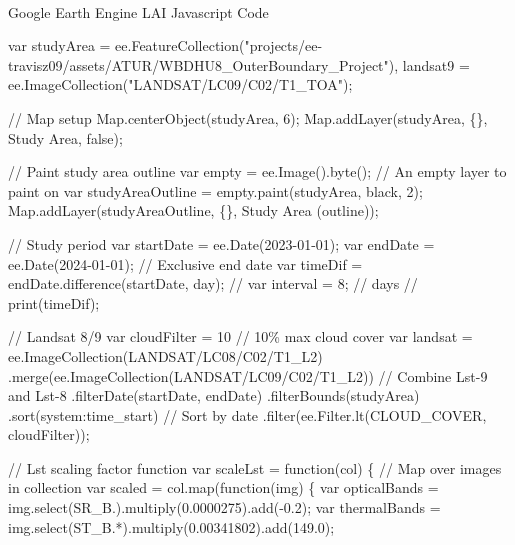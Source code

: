 \documentclass[
]{agujournal2019}
\makeatletter
\let\oldparagraph\paragraph
\renewcommand{\paragraph}{
    \@ifstar
      \xxxParagraphStar
      \xxxParagraphNoStar
  }
\newcommand{\xxxParagraphStar}[1]{\oldparagraph*{#1}\mbox{}}
\newcommand{\xxxParagraphNoStar}[1]{\oldparagraph{#1}\mbox{}}
\newenvironment{Shaded}{\begin{snugshade}}{\end{snugshade}}
\newcommand{\NormalTok}[1]{\textcolor[rgb]{0.00,0.23,0.31}{#1}}
\makeatother
\begin{document}
\paragraph{Google Earth Engine LAI Javascript
Code}\label{google-earth-engine-lai-javascript-code}

\begin{Shaded}
\begin{Highlighting}[]
\NormalTok{var studyArea = ee.FeatureCollection("projects/ee{-}travisz09/assets/ATUR/WBDHU8\_OuterBoundary\_Project"),}
\NormalTok{    landsat9 = ee.ImageCollection("LANDSAT/LC09/C02/T1\_TOA");}

\NormalTok{// Map setup}
\NormalTok{Map.centerObject(studyArea, 6);}
\NormalTok{Map.addLayer(studyArea, \{\}, \textquotesingle{}Study Area\textquotesingle{}, false);}

\NormalTok{// Paint study area outline}
\NormalTok{var empty = ee.Image().byte();  // An empty layer to paint on}
\NormalTok{var studyAreaOutline = empty.paint(studyArea, \textquotesingle{}black\textquotesingle{}, 2);}
\NormalTok{Map.addLayer(studyAreaOutline, \{\}, \textquotesingle{}Study Area (outline)\textquotesingle{});}

\NormalTok{// Study period}
\NormalTok{var startDate = ee.Date(\textquotesingle{}2023{-}01{-}01\textquotesingle{});}
\NormalTok{var endDate = ee.Date(\textquotesingle{}2024{-}01{-}01\textquotesingle{});  // Exclusive end date}
\NormalTok{var timeDif = endDate.difference(startDate, \textquotesingle{}day\textquotesingle{});}
\NormalTok{// var interval = 8;  // days}
\NormalTok{// print(timeDif);}

\NormalTok{// Landsat 8/9}
\NormalTok{var cloudFilter = 10  // 10\% max cloud cover}
\NormalTok{var landsat = ee.ImageCollection(\textquotesingle{}LANDSAT/LC08/C02/T1\_L2\textquotesingle{})}
\NormalTok{  .merge(ee.ImageCollection(\textquotesingle{}LANDSAT/LC09/C02/T1\_L2\textquotesingle{}))  // Combine Lst{-}9 and Lst{-}8}
\NormalTok{  .filterDate(startDate, endDate)}
\NormalTok{  .filterBounds(studyArea)}
\NormalTok{  .sort(\textquotesingle{}system:time\_start\textquotesingle{})  // Sort by date}
\NormalTok{  .filter(ee.Filter.lt(\textquotesingle{}CLOUD\_COVER\textquotesingle{}, cloudFilter));}
  
\NormalTok{// Lst scaling factor function}
\NormalTok{var scaleLst = function(col) \{}
\NormalTok{  // Map over images in collection}
\NormalTok{  var scaled = col.map(function(img) \{}
\NormalTok{    var opticalBands = img.select(\textquotesingle{}SR\_B.\textquotesingle{}).multiply(0.0000275).add({-}0.2);}
\NormalTok{    var thermalBands = img.select(\textquotesingle{}ST\_B.*\textquotesingle{}).multiply(0.00341802).add(149.0);}
    

\end{Highlighting}
\end{Shaded}
\end{document}

